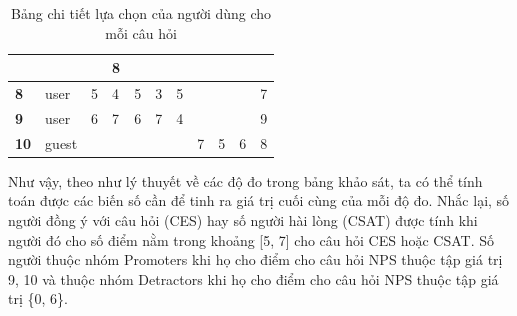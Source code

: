 \begin{table}[H]
{\begin{tabular}{|C{1cm}|p{1cm}|C{1cm}|C{1cm}|C{1cm}|C{1cm}|C{1.2cm}|C{1.2cm}|C{1.2cm}|C{1.2cm}|C{1.2cm}|}
                &
                &
                &
                8 
            \\ \hline
                \textbf{8} &
                user &
                5 &
                4 &
                5 &
                3 &
                5 &
                &
                &
                &
                7 
            \\ \hline
                \textbf{9} &
                user &
                6 &
                7 &
                6 &
                7 &
                4 &
                &
                &
                &
                9 
            \\ \hline
                \textbf{10} &
                guest &
                &
                &
                &
                &
                &
                7 &
                5 &
                6 &
                8 
            \\ \hline
        \end{tabular}
    }
    \caption{Bảng chi tiết lựa chọn của người dùng cho mỗi câu hỏi}
\end{table}
Như vậy, theo như lý thuyết về các độ đo trong bảng khảo sát, ta có thể tính toán được các biến số cần để tinh ra giá trị cuối cùng của mỗi độ đo.
Nhắc lại, số người đồng ý với câu hỏi (CES) hay số người hài lòng (CSAT) được tính khi người đó cho số điểm nằm trong khoảng [5, 7] cho câu hỏi CES 
hoặc CSAT. Số người thuộc nhóm Promoters khi họ cho điểm cho câu hỏi NPS thuộc tập giá trị {9, 10} và thuộc nhóm Detractors khi họ cho điểm cho câu hỏi 
NPS thuộc tập giá trị \{0, 6\}.
